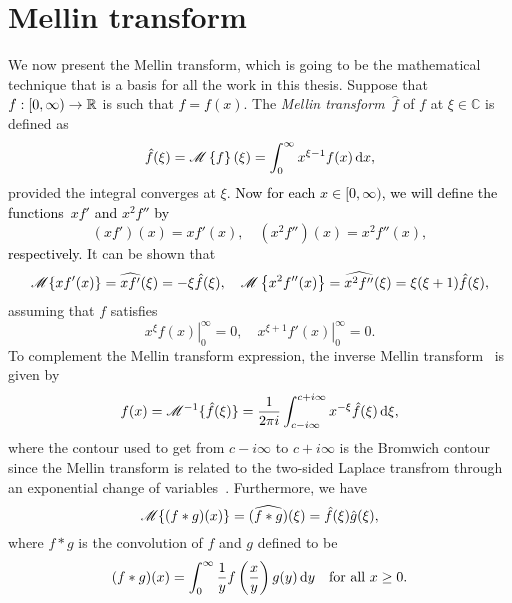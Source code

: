 \section{Mellin transform}
\label{subsec:mellin}
We now present the Mellin transform, which is going to be the mathematical technique that is a basis for all the work in this thesis. Suppose that $f : [0,\infty) \rightarrow \mathbb R$ is such that \textcolor{black}{$f = f(x)$}. The {\em Mellin transform}~$\hat f$ of $f$ at $\xi \in \mathbb{C}$ is defined as
\begin{equation*}
\hat f(\xi) =  \textcolor{black}{\mathscr M\left\{ f \right\}(\xi)} = \int_0^\infty x^{\xi - 1} f(x) \, \mathrm d x,
\end{equation*}
provided the integral converges at $\xi$. \textcolor{black}{Now for each $x \in [0,\infty)$, we will define the functions~$x f'$ and $x^2f''$ by
\begin{equation*}
(xf')(x) = x f'(x), \quad (x^2 f'')(x) = x^2 f''(x),
\end{equation*}
respectively.} It can be shown that \cite[pp. 362--363]{Myint1987}
\begin{equation}
\label{eqn:mellinDiv}
\mathscr M\{ xf'(x) \} = \widehat{x f'}(\xi) = -\xi \hat f(\xi), \quad \mathscr M\left\{ x^2f''(x) \right\} = \widehat{x^2 f''}(\xi) = \xi (\xi + 1) \hat f(\xi),
\end{equation}
assuming that $f$ satisfies
\begin{equation*}
\left. x^\xi f(x) \right\vert_0^\infty = 0, \quad \left. x^{\xi + 1} f'(x) \right\vert_0^\infty = 0.
\end{equation*}
To complement the Mellin transform expression, the inverse Mellin transform~\cite{Titchmarsh1948} is given by
\begin{equation*}
	f(x) = \mathscr M^{-1}\{\hat f(\xi)\} = \frac{1}{2\pi i} \int_{c-i\infty}^{c+i\infty} x^{-\xi}\hat f(\xi)  \, \mathrm d \xi,
\end{equation*}
where the contour used to get from $c - i\infty$ to $c + i\infty$ is the Bromwich contour since the Mellin transform is related to the two-sided Laplace transfrom through an exponential change of variables~\cite{Bracewell2000}. Furthermore, we have
	\begin{equation*}
		\mathscr M\{ (f \ast g)(x) \} = (\widehat{f \ast g})(\xi) = \hat f(\xi) \hat g(\xi),
	\end{equation*}
where $f \ast g$ is the convolution of $f$ and $g$ defined to be
	\begin{equation*}
		(f \ast g)(x) = \int_0^\infty \frac{1}{y}f\left(\frac{x}{y}\right)g(y) \, \mathrm d y \quad \text{for all } x \geq 0.
	\end{equation*}

